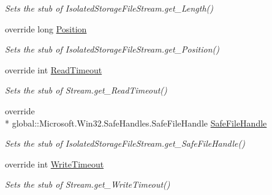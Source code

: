 \begin{DoxyCompactItemize}
\begin{DoxyCompactList}\small\item\em Sets the stub of Isolated\-Storage\-File\-Stream.\-get\-\_\-\-Length()\end{DoxyCompactList}\item 
override long \hyperlink{class_system_1_1_i_o_1_1_isolated_storage_1_1_fakes_1_1_stub_isolated_storage_file_stream_a81589ac682ae715452b9969d8b1061e2}{Position}
\begin{DoxyCompactList}\small\item\em Sets the stub of Isolated\-Storage\-File\-Stream.\-get\-\_\-\-Position()\end{DoxyCompactList}\item 
override int \hyperlink{class_system_1_1_i_o_1_1_isolated_storage_1_1_fakes_1_1_stub_isolated_storage_file_stream_a26ef087c072dc9fcad70f36a10ea1f2a}{Read\-Timeout}
\begin{DoxyCompactList}\small\item\em Sets the stub of Stream.\-get\-\_\-\-Read\-Timeout()\end{DoxyCompactList}\item 
override \\*
global\-::\-Microsoft.\-Win32.\-Safe\-Handles.\-Safe\-File\-Handle \hyperlink{class_system_1_1_i_o_1_1_isolated_storage_1_1_fakes_1_1_stub_isolated_storage_file_stream_aa64c44c739ea2a60e67e83ca472c8b84}{Safe\-File\-Handle}
\begin{DoxyCompactList}\small\item\em Sets the stub of Isolated\-Storage\-File\-Stream.\-get\-\_\-\-Safe\-File\-Handle()\end{DoxyCompactList}\item 
override int \hyperlink{class_system_1_1_i_o_1_1_isolated_storage_1_1_fakes_1_1_stub_isolated_storage_file_stream_ad086ecba5e15cf61cf85d4bfe4040c68}{Write\-Timeout}
\begin{DoxyCompactList}\small\item\em Sets the stub of Stream.\-get\-\_\-\-Write\-Timeout()\end{DoxyCompactList}\end{DoxyCompactItemize}


